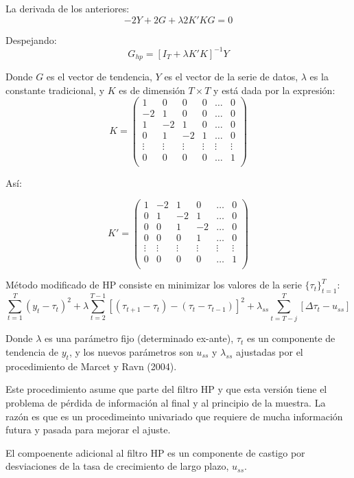\documentclass[
]{book}
\begin{document}
La derivada de los anteriores:
\[-2 Y + 2 G + \lambda 2 K' K G = 0\]

Despejando:
\[G_{hp} = [I_T + \lambda K' K]^{-1} Y\]

Donde \(G\) es el vector de tendencia, \(Y\) es el vector de la serie de datos, \(\lambda\) es la constante tradicional, y \(K\) es de dimensión \(T \times T\) y está dada por la expresión:
\[K =
\begin{pmatrix}
1 & 0 & 0 & 0 & \ldots & 0 \\
-2 & 1 & 0 & 0 & \ldots & 0 \\
1 & -2 & 1 & 0 & \ldots & 0 \\
0 & 1 & -2 & 1 & \ldots & 0 \\
\vdots & \vdots &  \vdots &  \vdots &  \vdots &  \vdots \\
0 & 0 & 0 & 0 & \ldots & 1 \\
\end{pmatrix}
\]

Así:

\[K' =
\begin{pmatrix}
1 & -2 & 1 & 0 & \ldots & 0 \\
0 & 1 & -2 & 1 & \ldots & 0 \\
0 & 0 & 1 & -2 & \ldots & 0 \\
0 & 0 & 0 & 1 & \ldots & 0 \\
\vdots & \vdots &  \vdots &  \vdots &  \vdots &  \vdots \\
0 & 0 & 0 & 0 & \ldots & 1 \\
\end{pmatrix}
\]

Método modificado de HP consiste en minimizar los valores de la serie \(\{ \tau_t \}_{t=1}^T\):
\[\sum_{t=1}^T (y_t - \tau_t)^2 + \lambda \sum_{t=2}^{T-1} [(\tau_{t+1} - \tau_t) - (\tau_t - \tau_{t-1})]^2 + \lambda_{ss} \sum_{t=T-j}^{T} [\Delta \tau_t - u_{ss}]\]

Donde \(\lambda\) es una parámetro fijo (determinado ex-ante), \(\tau_t\) es un componente de tendencia de \(y_t\), y los nuevos parámetros son \(u_{ss}\) y \(\lambda_{ss}\) ajustadas por el procedimiento de Marcet y Ravn (2004).

Este procedimiento asume que parte del filtro HP y que esta versión tiene el problema de pérdida de información al final y al principio de la muestra. La razón es que es un procedimeinto univariado que requiere de mucha información futura y pasada para mejorar el ajuste.

El compoenente adicional al filtro HP es un componente de castigo por desviaciones de la tasa de crecimiento de largo plazo, \(u_{ss}\).
\end{document}

